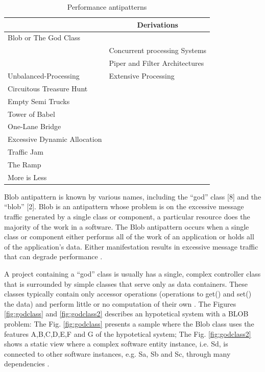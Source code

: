 \documentclass{report}
\begin{document}
\begin{table}[h]
\centering
\caption{Performance antipatterns}
\label{antipatterns}
\begin{tabular}{|l|l|}
\hline
\rowcolor[HTML]{C0C0C0} 
\multicolumn{1}{|c|}{\cellcolor[HTML]{C0C0C0}\textbf{antipattern}} & \multicolumn{1}{c|}{\cellcolor[HTML]{C0C0C0}\textbf{Derivations}} \\ \hline
Blob or The God Class &  \\ \hline
 & Concurrent processing Systems \\ \cline{2-2} 
 & Piper and Filter Architectures \\ \cline{2-2} 
\multirow{-3}{*}{Unbalanced-Processing} & Extensive Processing \\ \hline
Circuitous Treasure Hunt &  \\ \cline{1-1}
Empty Semi Trucks &  \\ \cline{1-1}
Tower of Babel &  \\ \cline{1-1}
One-Lane Bridge &  \\ \cline{1-1}
Excessive Dynamic Allocation &  \\ \cline{1-1}
Traffic Jam &  \\ \cline{1-1}
The Ramp  &  \\ \cline{1-1}
More is Less & \multirow{-10}{*}{} \\ \hline
\end{tabular}
\end{table}

Blob antipattern is known by various names, including the “god” class [8] and the “blob” [2]. Blob is an antipattern whose problem is on the excessive message traffic generated by a single class or component, a particular resource does the majority of the work in a software. The Blob antipattern occurs when a single class or component either performs all of the work of an application or holds all of the application’s data. Either manifestation results in excessive message traffic that can degrade performance \cite{Cortellessa2007} \cite{Smith2000}.

A project containing a “god” class is usually has a single, complex controller class that is surrounded by simple classes that serve only as data containers. These classes typically contain only accessor operations (operations to get() and set() the data) and perform little or no computation of their own \cite{Smith2000}.
The  Figures \ref{fig:godclass} and \ref{fig:godclass2} describes an hypotetical system with a BLOB problem:
The Fig. \ref{fig:godclass} presents a sample where the Blob class uses the features A,B,C,D,E,F and G of the hypotetical system; The Fig. \ref{fig:godclass2}  shows a static view where  a complex software entity instance, i.e. Sd, is connected to other software instances, e.g. Sa, Sb and Sc, through many dependencies \cite{Vetoio2011}\cite{Wert2013a}.
\end{document}

